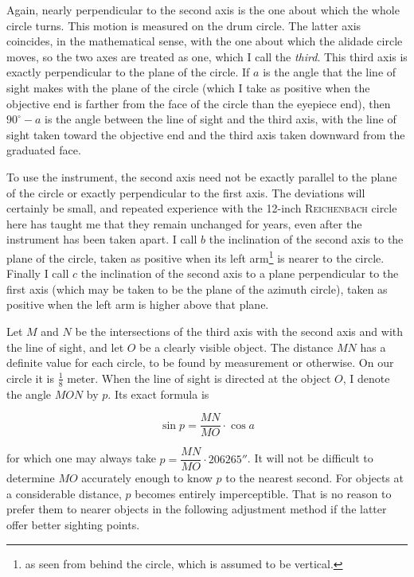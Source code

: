 \par\indent Again, nearly perpendicular to the second axis is the one about which the whole circle turns. This motion is measured on the drum circle. The latter axis coincides, in the mathematical sense, with the one  about which the alidade circle moves, so the two axes are treated as one, which I call the \emph{third}. This third axis is exactly perpendicular to the plane of the circle. If $a$ is the angle that the line of sight makes with the plane of the circle (which I take as positive when the objective end is farther from the face of the circle than the eyepiece end), then $90^\circ{-}a$ is the angle between the line of sight and the third axis, with the line of sight taken toward the objective end and the third axis taken downward from the graduated face.

\par\indent To use the instrument, the second axis need not be exactly parallel to the plane of the circle or exactly perpendicular to the first axis. The deviations will certainly be small, and repeated experience with the 12-inch \textsc{Reichenbach} circle here has taught me that they remain unchanged for years, even after the instrument has been taken apart. I call $b$ the inclination of the second axis to the plane of the circle, taken as positive when its left arm\footnote{as seen from behind the circle, which is assumed to be vertical.} is nearer to the circle. Finally I call $c$ the inclination of the second axis to a plane perpendicular to the first axis (which may be taken to be the plane of the azimuth circle), taken as positive when the left arm is higher above that plane.

\par\indent Let $M$ and $N$ be the intersections of the third axis with the second axis and with the line of sight, and let $O$ be a clearly visible object. The distance $MN$ has a definite value for each circle, to be found by measurement or otherwise. On our circle it is $\frac{1}{8}$ meter. When the line of sight is directed at the object $O$, I denote the angle $MON$ by $p$. Its exact formula is

\[ \sin p = \frac{MN}{MO}\cdot\cos a \]

\noindent for which one may always take $p = \dfrac{MN}{MO}\cdot 206265''$. It will not be difficult to determine $MO$ accurately enough to know $p$ to the nearest second. For objects at a considerable distance, $p$ becomes entirely imperceptible. That is no reason to prefer them to nearer objects in the following adjustment method if the latter offer better sighting points.

